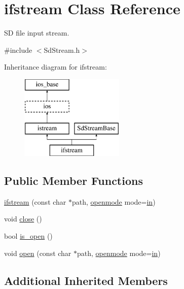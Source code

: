 \hypertarget{classifstream}{\section{ifstream Class Reference}
\label{classifstream}
}


S\-D file input stream.  




{\ttfamily \#include $<$Sd\-Stream.\-h$>$}

Inheritance diagram for ifstream\-:\begin{figure}[H]
\begin{center}
\leavevmode
\includegraphics[height=4.000000cm]{classifstream}
\end{center}
\end{figure}
\subsection*{Public Member Functions}
\begin{DoxyCompactItemize}
\item 
\hyperlink{classifstream_a1c1d6050cb82754b5d7b93b7f340ccbc}{ifstream} (const char $\ast$path, \hyperlink{classios__base_a97a503456f60758f2c110f99b0ce0815}{openmode} mode=\hyperlink{classios__base_a371ab336bfce00a620526ba26f9be813}{in})
\item 
void \hyperlink{classifstream_a5ae591df94fc66ccb85cbb6565368bca}{close} ()
\item 
bool \hyperlink{classifstream_a2f57f54d8c03b615bb31eee091d8a88a}{is\-\_\-open} ()
\item 
void \hyperlink{classifstream_ab1bbd0e8cde517068ea4633e4e19f2a2}{open} (const char $\ast$path, \hyperlink{classios__base_a97a503456f60758f2c110f99b0ce0815}{openmode} mode=\hyperlink{classios__base_a371ab336bfce00a620526ba26f9be813}{in})
\end{DoxyCompactItemize}
\subsection*{Additional Inherited Members}


